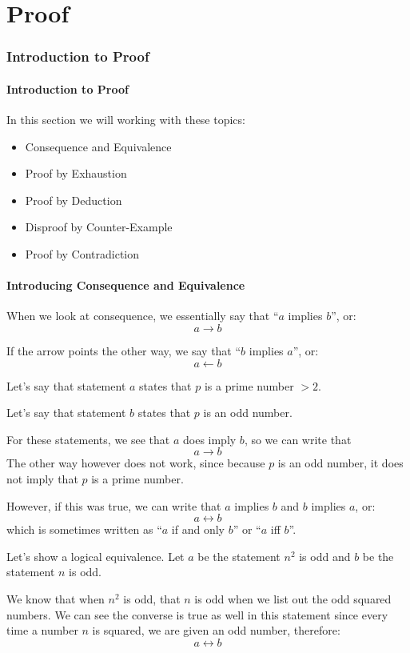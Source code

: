 \documentclass[../maths.tex]{subfiles}
\begin{document}
\chapter{Proof}
\subsection*{Introduction to Proof}
\subsubsection*{Introduction to Proof}
In this section we will working with these topics:
\begin{itemize}
    \item Consequence and Equivalence
    \item Proof by Exhaustion
    \item Proof by Deduction
    \item Disproof by Counter-Example
    \item Proof by Contradiction
\end{itemize}

\subsubsection*{Introducing Consequence and Equivalence}

When we look at consequence, we essentially say that ``$a$ implies $b$'', or:
\[a\rightarrow b\]

If the arrow points the other way, we say that ``$b$ implies $a$'', or:
\[a\leftarrow b\]

Let's say that statement $a$ states that $p$ is a prime number $>2$.

Let's say that statement $b$ states that $p$ is an odd number.

For these statements, we see that $a$ does imply $b$, so we can write that
\[a\rightarrow b\]
The other way however does not work, since because $p$ is an odd number, it does not imply that $p$ is a prime number.

However, if this was true, we can write that $a$ implies $b$ and $b$ implies $a$, or:
\[a\leftrightarrow b\]
which is sometimes written as ``$a$ if and only $b$'' or ``$a$ iff $b$''.

Let's show a logical equivalence. Let $a$ be the statement $n^2$ is odd and $b$ be the statement $n$ is odd.

We know that when $n^2$ is odd, that $n$ is odd when we list out the odd squared numbers. We can see the converse is true as well in this statement since every time a number $n$ is squared, we are given an odd number, therefore:
\[a\leftrightarrow b\]
\end{document}
